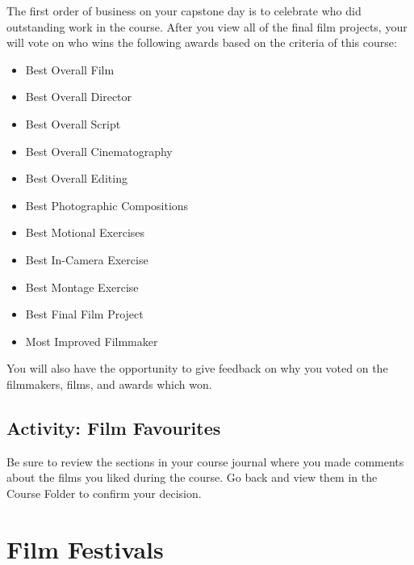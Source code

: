 \documentclass[
  letterpaper,
  DIV=11,
  numbers=noendperiod]{scrreprt}
\providecommand{\tightlist}{%
  \setlength{\itemsep}{0pt}\setlength{\parskip}{0pt}}\usepackage{longtable,booktabs,array}
\begin{document}
The first order of business on your capstone day is to celebrate who did
outstanding work in the course. After you view all of the final film
projects, your will vote on who wins the following awards based on the
criteria of this course:

\begin{itemize}
\tightlist
\item
  Best Overall Film
\item
  Best Overall Director
\item
  Best Overall Script
\item
  Best Overall Cinematography
\item
  Best Overall Editing
\item
  Best Photographic Compositions
\item
  Best Motional Exercises
\item
  Best In-Camera Exercise
\item
  Best Montage Exercise
\item
  Best Final Film Project
\item
  Most Improved Filmmaker
\end{itemize}

You will also have the opportunity to give feedback on why you voted on
the filmmakers, films, and awards which won.

\subsection{Activity: Film Favourites}\label{activity-film-favourites}

\begin{tcolorbox}[enhanced jigsaw, titlerule=0mm, opacitybacktitle=0.6, left=2mm, title={Learning Activity}, coltitle=black, colbacktitle=quarto-callout-note-color!10!white, toptitle=1mm, bottomtitle=1mm, colframe=quarto-callout-note-color-frame, colback=white, arc=.35mm, rightrule=.15mm, bottomrule=.15mm, toprule=.15mm, opacityback=0, breakable, leftrule=.75mm]

Be sure to review the sections in your course journal where you made
comments about the films you liked during the course. Go back and view
them in the Course Folder to confirm your decision.

\end{tcolorbox}

\section{Film Festivals}\label{film-festivals}
\end{document}
